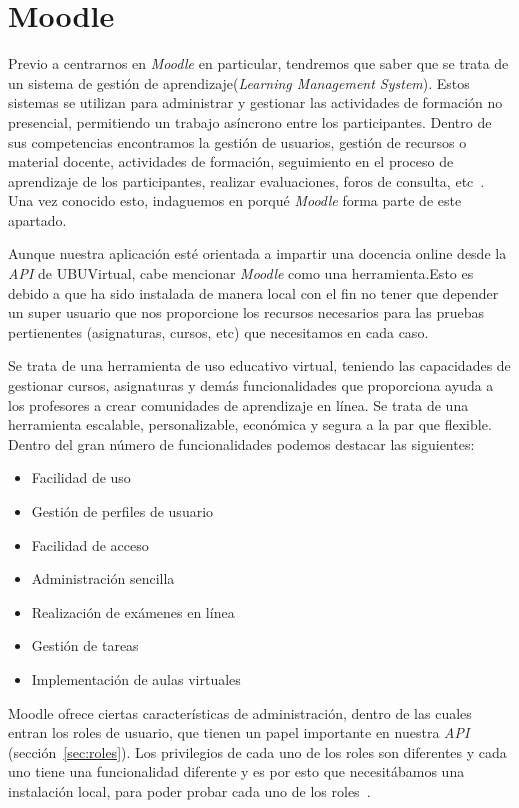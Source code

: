 
\section{Moodle}\label{sec:moodle-local}
Previo a centrarnos en \textit{Moodle} en particular, tendremos que saber que se trata de un sistema de gestión de aprendizaje(\textit{Learning Management System}). Estos sistemas se utilizan para administrar y gestionar las actividades de formación no presencial, permitiendo un trabajo asíncrono entre los participantes. Dentro de sus competencias encontramos la gestión de usuarios, gestión de recursos o material docente, actividades de formación, seguimiento en el proceso de aprendizaje de los participantes, realizar evaluaciones, foros de consulta, etc~\cite{wiki:sistemaGestionAprendizaje}. Una vez conocido esto, indaguemos en porqué \textit{Moodle} forma parte de este apartado.

Aunque nuestra aplicación esté orientada a impartir una docencia online desde la \textit{API} de UBUVirtual, cabe mencionar \textit{Moodle} como una herramienta.Esto es debido a que ha sido instalada de manera local con el fin no tener que depender un super usuario que nos proporcione los recursos necesarios para las pruebas pertienentes (asignaturas, cursos, etc) que necesitamos en cada caso.

Se trata de una herramienta de uso educativo virtual, teniendo las capacidades de gestionar cursos, asignaturas y demás funcionalidades que proporciona ayuda a los profesores a crear comunidades de aprendizaje en línea. Se trata de una herramienta escalable, personalizable, económica y segura a la par que flexible. Dentro del gran número de funcionalidades podemos destacar las siguientes:

\begin{itemize}
	\item Facilidad de uso
	\item Gestión de perfiles de usuario
	\item Facilidad de acceso
	\item Administración sencilla
	\item Realización de exámenes en línea
	\item Gestión de tareas
	\item Implementación de aulas virtuales
\end{itemize}

Moodle ofrece ciertas características de administración, dentro de las cuales entran los roles de usuario, que tienen un papel importante en nuestra \textit{API} (sección~\ref{sec:roles}). Los privilegios de cada uno de los roles son diferentes y cada uno tiene una funcionalidad diferente y es por esto que necesitábamos una instalación local, para poder probar cada uno de los roles~\cite{wiki:moodle}.

